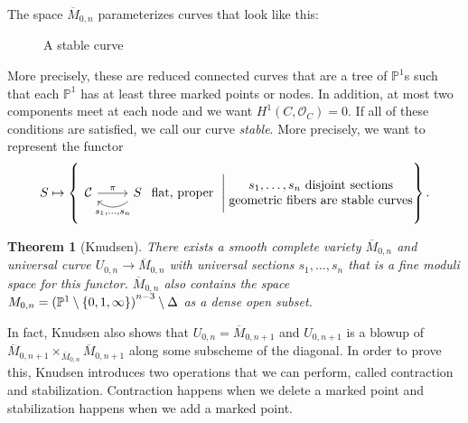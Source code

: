 \documentclass[leqno, openany]{memoir}
\newtheorem{thm}{Theorem}[section]
\theoremstyle{definition}
\theoremstyle{remark}
\theoremstyle{plain}
\theoremstyle{definition}
\theoremstyle{remark}
\renewcommand{\P}{\mathbb{P}}
\newcommand{\mc}[1]{\mathcal{#1}}
\newcommand{\ol}[1]{\overline{#1}}
\begin{document}
The space $\ol{M}_{0,n}$ parameterizes curves that look like this:
\begin{figure}[H] \begin{center} 
            \end{center} \caption{A stable curve}%
        \end{figure} More precisely, these are reduced connected curves that
        are a tree of $\P^1$s such that each $\P^1$ has at least three marked
        points or nodes. In addition, at most two components meet at each node
        and we want $H^1(C, \mc{O}_C) = 0$. If all of these conditions are
        satisfied, we call our curve \textit{stable}. More precisely, we want
        to represent the functor \[ S \mapsto \left\{ \begin{tikzcd} \mc{C}
            \ar{r}{\pi} & S \ar[bend left=40]{l}{s_1, \ldots, s_n}
        \end{tikzcd} \text{ flat, proper } \Biggm\vert \Centerstack{ {$s_1,
        \ldots, s_n$ disjoint sections} {geometric fibers are stable curves} }
\right\}. \]

\begin{thm}[Knudsen] There exists a smooth complete variety $\ol{M}_{0,n}$ and
    universal curve $U_{0,n} \to \ol{M}_{0,n}$ with universal sections $s_1,
    \ldots, s_n$ that is a fine moduli space for this functor. $\ol{M}_{0,n}$
    also contains the space $M_{0,n} = {(\P^1 \setminus
    \qty{0,1,\infty})}^{n-3} \setminus \Delta$ as a dense open subset.
\end{thm}

In fact, Knudsen also shows that $U_{0,n} = \ol{M}_{0, n+1}$ and $U_{0,n+1}$ is
a blowup of $\ol{M}_{0,n+1} \times_{\ol{M}_{0,n}} \ol{M}_{0,n+1}$ along some
subscheme of the diagonal. In order to prove this, Knudsen introduces two
operations that we can perform, called contraction and stabilization.
Contraction happens when we delete a marked point and stabilization happens
when we add a marked point.
\end{document}
